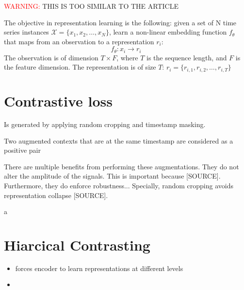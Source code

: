 \textcolor{red}{WARNING:} THIS IS TOO SIMILAR TO THE ARTICLE


The objective in representation learning is the following: given a set of N time series instances $\mathcal{X}=\{x_1, x_2, \dots, x_N\}$, learn a non-linear embedding function $f_\theta$ that maps from an observation to a representation $r_i$:
\[
f_\theta: x_i \to r_i
\]
The observation is of dimension $T \times F$, where $T$ is the sequence length, and $F$ is the feature dimension. The representation is of size $T$: $r_i = \{r_{i,1}, r_{i,2}, \dots, r_{i,T}\}$


\section{Contrastive loss}



\begin{definition}[Context]
    Is generated by applying random cropping and timestamp masking.
\end{definition}


\begin{definition}
    Two augmented contexts that are at the same timestamp are considered as a positive pair
\end{definition}

There are multiple benefits from performing these augmentations. They do not alter the amplitude of the signals. This is important because [SOURCE]. Furthermore, they do enforce robustness... Specially, random cropping avoids representation collapse [SOURCE]. 

a
\section{Hiarcical Contrasting}
\begin{itemize}
    \item forces encoder to learn representations at different levels
    \item 
\end{itemize}





